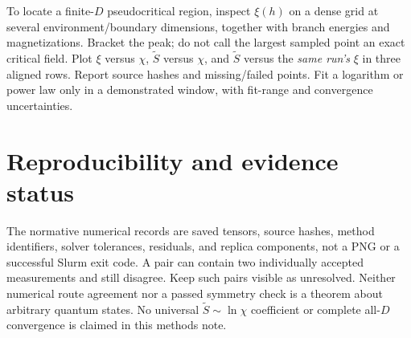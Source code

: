 \documentclass[11pt]{article}
\newcommand{\tS}{\widetilde S}
\begin{document}
To locate a finite-$D$ pseudocritical region, inspect $\xi(h)$ on a dense grid
at several environment/boundary dimensions, together with branch energies and
magnetizations. Bracket the peak; do not call the largest sampled point an
exact critical field. Plot $\xi$ versus $\chi$, $\tS$ versus $\chi$, and
$\tS$ versus the \emph{same run's} $\xi$ in three aligned rows. Report source
hashes and missing/failed points. Fit a logarithm or power law only in a
demonstrated window, with fit-range and convergence uncertainties.

\section{Reproducibility and evidence status}
The normative numerical records are saved tensors, source hashes, method
identifiers, solver tolerances, residuals, and replica components, not a PNG
or a successful Slurm exit code. A pair can contain two individually accepted
measurements and still disagree. Keep such pairs visible as unresolved.
Neither numerical route agreement nor a passed symmetry check is a theorem
about arbitrary quantum states. No universal $\tS\sim\ln\chi$ coefficient or
complete all-$D$ convergence is claimed in this methods note.

\ifdetailed
\end{document}
